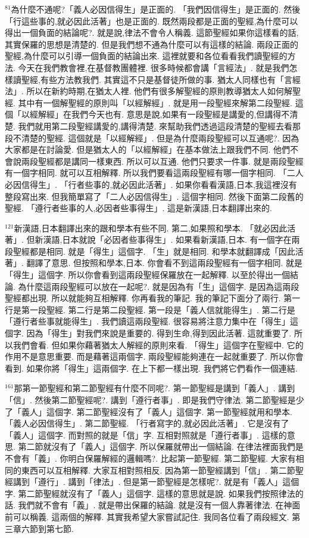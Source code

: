 \documentclass{book}
\begin{document}
$^{81}$為什麼不通呢?「義人必因信得生」是正面的.
「我們因信得生」是正面的.
然後「行這些事的,就必因此活著」也是正面的.
既然兩段都是正面的聖經,為什麼可以得出一個負面的結論呢?.
就是說,律法不會令人稱義.
這節聖經如果你這樣看的話,其實保羅的思想是清楚的.
但是我們想不通為什麼可以有這樣的結論.
兩段正面的聖經,為什麼可以引導一個負面的結論出來.
這裡就要和各位看看我們讀聖經的方法.
今天在我們教會裡,在基督教團體裡.
很多時候都會講「言經法」.
就是我們怎樣讀聖經,有些方法教我們.
其實這不只是基督徒所做的事.
猶太人同樣也有「言經法」.
所以在新約時期,在猶太人裡.
他們有很多解聖經的原則教導猶太人如何解聖經.
其中有一個解聖經的原則叫「以經解經」.
就是用一段聖經來解第二段聖經.
這個「以經解經」在我們今天也有.
意思是說,如果有一段聖經是講愛的,但講得不清楚.
我們就用第二段聖經講愛的,講得清楚.
來幫助我們透過這段清楚的聖經去看那段不清楚的聖經.
這個就是「以經解經」.
但是為什麼兩段聖經可以互通呢?.
因為大家都是在討論愛.
但是猶太人的「以經解經」在基本做法上跟我們不同.
他們不會說兩段聖經都是講同一樣東西.
所以可以互通.
他們只要求一件事.
就是兩段聖經有一個字相同.
就可以互相解釋.
所以我們要看這兩段聖經有哪一個字相同.
「二人必因信得生」.
「行者些事的,就必因此活著」.
如果你看看漢語,日本,我這裡沒有整段寫出來.
但我簡單寫了「二人必因信得生」.
這個字相同.
然後下面第二段舊的聖經.
「遵行者些事的人,必因者些事得生」.
這是新漢語,日本翻譯出來的.

$^{121}$新漢語,日本翻譯出來的跟和學本有些不同.
第二,如果照和學本.
「就必因此活著」.
但新漢語,日本就說「必因者些事得生」.
如果看新漢語,日本.
有一個字在兩段聖經都是相同.
就是「得生」這個字.
「生」就是相同.
和學本就翻譯成「因此活著」.
翻譯了意思.
但按照和學本,日本.
你會看不到這兩段聖經有一個字相同.
就是「得生」這個字.
所以你會看到這兩段聖經保羅放在一起解釋.
以至於得出一個結論.
為什麼這兩段聖經可以放在一起呢?.
就是因為有「生」這個字.
是因為這兩段聖經都出現.
所以就能夠互相解釋.
你再看我的筆記.
我的筆記下面分了兩行.
第一行是第一段聖經.
第二行是第二段聖經.
第一段是「義人信就能得生」.
第二行是「遵行者些事就能得生」.
我們讀這兩段聖經.
很容易將注意力集中在「得生」這個字.
因為「得生」對我們來說是重要的.
得到生命,得到因此活著.
這就重要了.
所以我們會看.
但如果你藉著猶太人解經的原則來看.
「得生」這個字在聖經中.
它的作用不是意思重要.
而是藉著這兩個字.
兩段聖經能夠連在一起就重要了.
所以你會看到.
如果你將「得生」這兩個字.
在上下都一樣出現.
我們將它們看作一個連結.

$^{161}$那第一節聖經和第二節聖經有什麼不同呢?.
第一節聖經是講到「義人」.
講到「信」.
然後第二節聖經呢?.
講到「遵行者事」.
即是我們守律法.
第二節聖經是少了「義人」這個字.
第二節聖經沒有了「義人」這個字.
第一節聖經就用和學本.
「義人必因信得生」.
第二節聖經.
「行者寫字的,就必因此活著」.
它是沒有了「義人」這個字.
而對照的就是「信」字.
互相對照就是「遵行者事」.
這樣的意思.
第二節就沒有了「義人」這個字.
所以保羅就帶出一個結論.
在律法裡面我們是不會有「義」.
你明白保羅解經的邏輯嗎?.
比起第一節聖經.
第二節聖經.
大家有相同的東西可以互相解釋.
大家互相對照相反.
因為第一節聖經講到「信」.
第二節聖經講到「遵行」.
講到「律法」.
但是第一節聖經是怎樣呢?.
就是有「義人」這個字.
第二節聖經就沒有了「義人」這個字.
這樣的意思就是說.
如果我們按照律法的話.
我們就不會有「義」.
就是帶出保羅的結論.
就是沒有一個人靠著律法.
在神面前可以稱義.
這兩個的解釋.
其實我希望大家嘗試記住.
我同各位看了兩段經文.
第三章六節到第七節.
\end{document}
